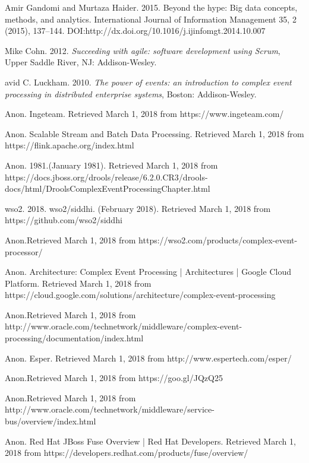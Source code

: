 \documentclass[a4paper]{article}
\begin{document}
\begin{thebibliography}{9}

Amir Gandomi and Murtaza Haider. 2015. Beyond the hype: Big data concepts, methods, and analytics. International Journal of Information Management 35, 2 (2015), 137–144. DOI:http://dx.doi.org/10.1016/j.ijinfomgt.2014.10.007 

Mike Cohn. 2012. \textit{Succeeding with agile: software development using Scrum}, Upper Saddle River, NJ: Addison-Wesley.

avid C. Luckham. 2010. \textit{The power of events: an introduction to complex event processing in distributed enterprise systems}, Boston: Addison-Wesley.

Anon. Ingeteam. Retrieved March 1, 2018 from https://www.ingeteam.com/ 

Anon. Scalable Stream and Batch Data Processing. Retrieved March 1, 2018 from https://flink.apache.org/index.html

Anon. 1981.(January 1981). Retrieved March 1, 2018 from https://docs.jboss.org/drools/release/6.2.0.CR3/drools-docs/html/DroolsComplexEventProcessingChapter.html 

wso2. 2018. wso2/siddhi. (February 2018). Retrieved March 1, 2018 from https://github.com/wso2/siddhi

Anon.Retrieved March 1, 2018 from https://wso2.com/products/complex-event-processor/ 

Anon. Architecture: Complex Event Processing  |  Architectures  |  Google Cloud Platform. Retrieved March 1, 2018 from https://cloud.google.com/solutions/architecture/complex-event-processing

Anon.Retrieved March 1, 2018 from http://www.oracle.com/technetwork/middleware/complex-event-processing/documentation/index.html

Anon. Esper. Retrieved March 1, 2018 from http://www.espertech.com/esper/ 

Anon.Retrieved March 1, 2018 from https://goo.gl/JQzQ25

Anon.Retrieved March 1, 2018 from http://www.oracle.com/technetwork/middleware/service-bus/overview/index.html 

Anon. Red Hat JBoss Fuse Overview | Red Hat Developers. Retrieved March 1, 2018 from https://developers.redhat.com/products/fuse/overview/ 


\end{thebibliography}
\end{document}
